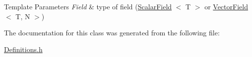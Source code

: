 \begin{DoxyTemplParams}{Template Parameters}
{\em Field} & type of field (\hyperlink{structUintah_1_1PhaseField_1_1ScalarField}{Scalar\+Field} $<$ T $>$ or \hyperlink{structUintah_1_1PhaseField_1_1VectorField}{Vector\+Field} $<$ T, N $>$) \\
\hline
\end{DoxyTemplParams}


The documentation for this class was generated from the following file\+:\begin{DoxyCompactItemize}
\item 
\hyperlink{Definitions_8h}{Definitions.\+h}\end{DoxyCompactItemize}
